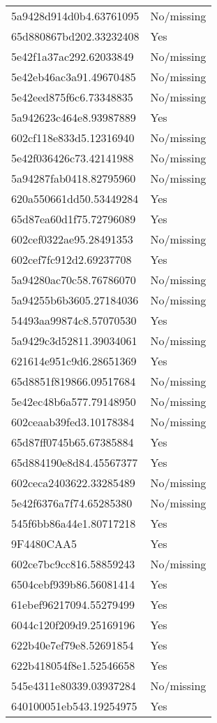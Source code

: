 \begin{tabular}{ll}
5a9428d914d0b4.63761095 & No/missing \\
65d880867bd202.33232408 & Yes \\
5e42f1a37ac292.62033849 & No/missing \\
5e42eb46ac3a91.49670485 & No/missing \\
5e42eed875f6c6.73348835 & No/missing \\
5a942623c464e8.93987889 & Yes \\
602cf118e833d5.12316940 & No/missing \\
5e42f036426c73.42141988 & No/missing \\
5a94287fab0418.82795960 & No/missing \\
620a550661dd50.53449284 & Yes \\
65d87ea60d1f75.72796089 & Yes \\
602cef0322ae95.28491353 & No/missing \\
602cef7fc912d2.69237708 & Yes \\
5a94280ac70c58.76786070 & No/missing \\
5a94255b6b3605.27184036 & No/missing \\
54493aa99874c8.57070530 & Yes \\
5a9429c3d52811.39034061 & No/missing \\
621614e951c9d6.28651369 & Yes \\
65d8851f819866.09517684 & No/missing \\
5e42ec48b6a577.79148950 & No/missing \\
602ceaab39fed3.10178384 & No/missing \\
65d87ff0745b65.67385884 & Yes \\
65d884190e8d84.45567377 & Yes \\
602ceca2403622.33285489 & No/missing \\
5e42f6376a7f74.65285380 & No/missing \\
545f6bb86a44e1.80717218 & Yes \\
9F4480CAA5 & Yes \\
602ce7bc9cc816.58859243 & No/missing \\
6504cebf939b86.56081414 & Yes \\
61ebef96217094.55279499 & Yes \\
6044c120f209d9.25169196 & Yes \\
622b40e7ef79e8.52691854 & Yes \\
622b418054f8e1.52546658 & Yes \\
545e4311e80339.03937284 & No/missing \\
640100051eb543.19254975 & Yes \\

\end{tabular}
